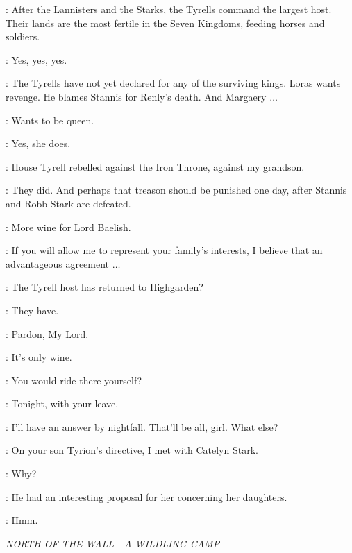 \LITTLEFINGER: After the Lannisters and the Starks, the Tyrells command the largest host. Their lands are the most fertile in the Seven Kingdoms, feeding horses and soldiers. 

\TYWIN: Yes, yes, yes. 

\LITTLEFINGER: The Tyrells have not yet declared for any of the surviving kings. Loras wants revenge. He blames Stannis for Renly's death. And Margaery $\ldots$  

\TYWIN: Wants to be queen. 

\LITTLEFINGER: Yes, she does. 

\TYWIN: House Tyrell rebelled against the Iron Throne, against my grandson. 

\LITTLEFINGER: They did. And perhaps that treason should be punished one day, after Stannis and Robb Stark are defeated. 

\TYWIN:   More wine for Lord Baelish. 


\LITTLEFINGER: If you will allow me to represent your family's interests, I believe that an advantageous agreement $\ldots$  

\TYWIN: The Tyrell host has returned to Highgarden? 

\LITTLEFINGER: They have.


\ARYA: Pardon, My Lord. 

\LITTLEFINGER: It's only wine. 

\TYWIN: You would ride there yourself? 

\LITTLEFINGER: Tonight, with your leave. 

\TYWIN: I'll have an answer by nightfall. That'll be all, girl. What else? 

\LITTLEFINGER: On your son Tyrion's directive, I met with Catelyn Stark. 

\TYWIN: Why? 

\LITTLEFINGER: He had an interesting proposal for her concerning her daughters. 

\TYWIN: Hmm. 


\scene

\textit{NORTH OF THE WALL - A WILDLING CAMP} 


